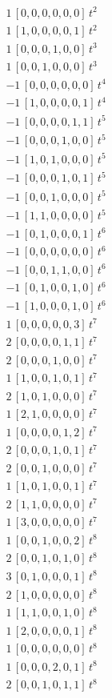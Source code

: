 \begin{align*}
1\,[0,0,0,0,0,0]\,t^{2} \\
1\,[1,0,0,0,0,1]\,t^{2} \\
1\,[0,0,0,1,0,0]\,t^{3} \\
1\,[0,0,1,0,0,0]\,t^{3} \\
-1\,[0,0,0,0,0,0]\,t^{4} \\
-1\,[1,0,0,0,0,1]\,t^{4} \\
-1\,[0,0,0,0,1,1]\,t^{5} \\
-1\,[0,0,0,1,0,0]\,t^{5} \\
-1\,[1,0,1,0,0,0]\,t^{5} \\
-1\,[0,0,0,1,0,1]\,t^{5} \\
-1\,[0,0,1,0,0,0]\,t^{5} \\
-1\,[1,1,0,0,0,0]\,t^{5} \\
-1\,[0,1,0,0,0,1]\,t^{6} \\
-1\,[0,0,0,0,0,0]\,t^{6} \\
-1\,[0,0,1,1,0,0]\,t^{6} \\
-1\,[0,1,0,0,1,0]\,t^{6} \\
-1\,[1,0,0,0,1,0]\,t^{6} \\
1\,[0,0,0,0,0,3]\,t^{7} \\
2\,[0,0,0,0,1,1]\,t^{7} \\
2\,[0,0,0,1,0,0]\,t^{7} \\
1\,[1,0,0,1,0,1]\,t^{7} \\
2\,[1,0,1,0,0,0]\,t^{7} \\
1\,[2,1,0,0,0,0]\,t^{7} \\
1\,[0,0,0,0,1,2]\,t^{7} \\
2\,[0,0,0,1,0,1]\,t^{7} \\
2\,[0,0,1,0,0,0]\,t^{7} \\
1\,[1,0,1,0,0,1]\,t^{7} \\
2\,[1,1,0,0,0,0]\,t^{7} \\
1\,[3,0,0,0,0,0]\,t^{7} \\
1\,[0,0,1,0,0,2]\,t^{8} \\
2\,[0,0,1,0,1,0]\,t^{8} \\
3\,[0,1,0,0,0,1]\,t^{8} \\
2\,[1,0,0,0,0,0]\,t^{8} \\
1\,[1,1,0,0,1,0]\,t^{8} \\
1\,[2,0,0,0,0,1]\,t^{8} \\
1\,[0,0,0,0,0,0]\,t^{8} \\
1\,[0,0,0,2,0,1]\,t^{8} \\
2\,[0,0,1,0,1,1]\,t^{8} \\

\end{align*}
